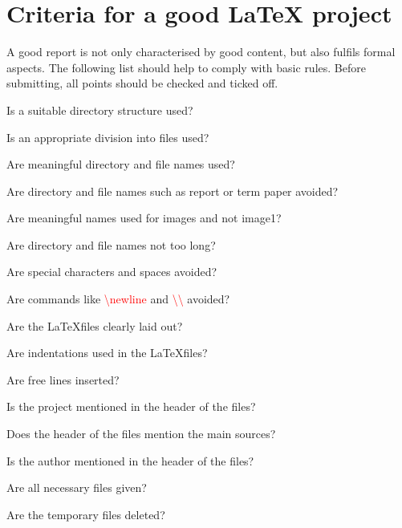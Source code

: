 %
%




\chapter{Criteria for a good \LaTeX{} project}


A good report is not only characterised by good content, but also fulfils formal aspects. The following list should help to comply with basic rules. Before submitting, all points should be checked and ticked off.


\begin{todolist}
    \item Is a suitable directory structure used?
    \item Is an appropriate division into files used?
    \item Are meaningful directory and file names used?
    \begin{todolist}
        \item Are directory and file names such as report or term paper avoided?
        \item Are meaningful names used for images and not \glqq image1\grqq?
        \item Are directory and file names not too long?
        \item Are special characters and spaces avoided?
    \end{todolist}
    \item Are commands like \textcolor{red}{\textbackslash newline} and \textcolor{red}{\textbackslash\textbackslash} avoided?
    \item Are the \LaTeX files clearly laid out?
    \begin{todolist}
        \item Are indentations used in the \LaTeX files?
        \item Are free lines inserted?
        \item Is the project mentioned in the header of the files?
        \item Does the header of the files mention the main sources?
        \item Is the author mentioned in the header of the files?
    \end{todolist}
    \item Are all necessary files given?
    \item Are the temporary files deleted?

\end{todolist}
